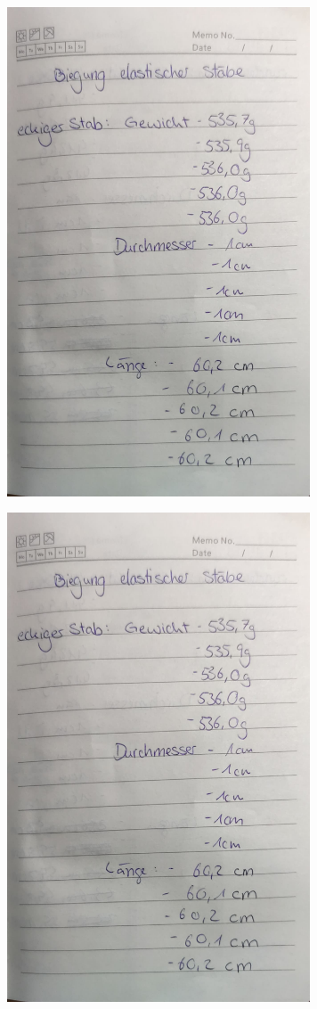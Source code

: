 \begin{figure}
    \includegraphics[page=3, width=9cm]{Bilder/Messwerte.pdf}
\end{figure}
\begin{figure}
    \includegraphics[page=4, width=9cm]{Bilder/Messwerte.pdf}
\end{figure}
